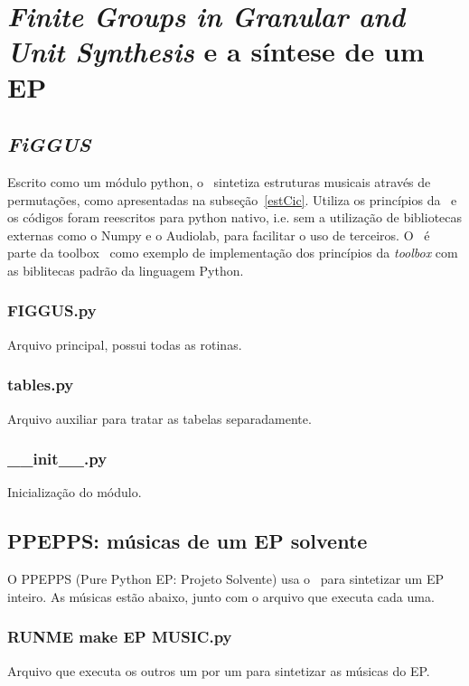 \chapter{\emph{Finite Groups in Granular and Unit Synthesis} e a síntese de um EP}
\label{cap:FIGGUScode}
\section{\emph{FiGGUS}}

Escrito como um módulo python, o \figgus\ sintetiza estruturas
musicais através de permutações, como apresentadas na subseção~\ref{estCic}. Utiliza os princípios da \massa\
e os códigos foram reescritos para python nativo, i.e. sem a 
utilização de bibliotecas externas como o Numpy e o Audiolab, para facilitar
o uso de terceiros. O \figgus\ é parte da toolbox \massa\ como exemplo de implementação dos princípios da \emph{toolbox} com as biblitecas padrão da linguagem Python.\cite{MASSA}


\subsection{FIGGUS.py}\label{ap:figgus.py}
Arquivo principal, possui todas as rotinas.


\subsection{tables.py}\label{ap:tables.py}
Arquivo auxiliar para tratar as tabelas separadamente.

\subsection{\_\_init\_\_.py}\label{ap:init.py}
Inicialização do módulo.


\section{PPEPPS: músicas de um EP solvente}
O PPEPPS (Pure Python EP: Projeto Solvente) usa
o \figgus\ para sintetizar um EP inteiro. As músicas
estão abaixo, junto com o arquivo que executa cada uma.

\subsection{RUNME make EP MUSIC.py}\label{ap:RUNME.py}
Arquivo que executa os outros um por um para sintetizar as músicas do EP.

